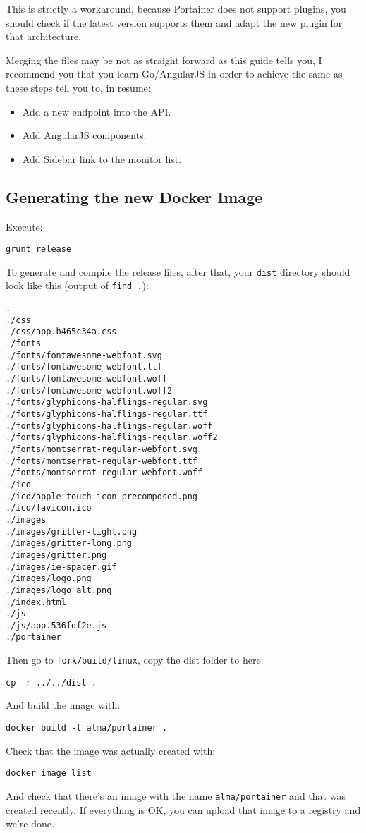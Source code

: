This is strictly a workaround, because Portainer does not support plugins, you
should check if the latest version supports them and adapt the new plugin for
that architecture.

Merging the files may be not as straight forward as this guide tells you,
I recommend you that you learn Go/AngularJS in order to achieve the same as
these steps tell you to, in resume:

\begin{itemize}
    \item Add a new endpoint into the API.
    \item Add AngularJS components.
    \item Add Sidebar link to the monitor list.
\end{itemize}

\subsection{Generating the new Docker Image}

Execute:

\begin{lstlisting}
grunt release
\end{lstlisting}

To generate and compile the release files, after that, your \texttt{dist} directory should look like this (output of \texttt{find .}):

\begin{lstlisting}
.
./css
./css/app.b465c34a.css
./fonts
./fonts/fontawesome-webfont.svg
./fonts/fontawesome-webfont.ttf
./fonts/fontawesome-webfont.woff
./fonts/fontawesome-webfont.woff2
./fonts/glyphicons-halflings-regular.svg
./fonts/glyphicons-halflings-regular.ttf
./fonts/glyphicons-halflings-regular.woff
./fonts/glyphicons-halflings-regular.woff2
./fonts/montserrat-regular-webfont.svg
./fonts/montserrat-regular-webfont.ttf
./fonts/montserrat-regular-webfont.woff
./ico
./ico/apple-touch-icon-precomposed.png
./ico/favicon.ico
./images
./images/gritter-light.png
./images/gritter-long.png
./images/gritter.png
./images/ie-spacer.gif
./images/logo.png
./images/logo_alt.png
./index.html
./js
./js/app.536fdf2e.js
./portainer
\end{lstlisting}

Then go to \texttt{fork/build/linux}, copy the dist folder to here:

\begin{lstlisting}
cp -r ../../dist .
\end{lstlisting}

And build the image with:

\begin{lstlisting}
docker build -t alma/portainer .
\end{lstlisting}

Check that the image was actually created with:

\begin{lstlisting}
docker image list
\end{lstlisting}

And check that there's an image with the name \texttt{alma/portainer} and that was created recently. If everything is OK, you can upload that image to a registry and we're done.